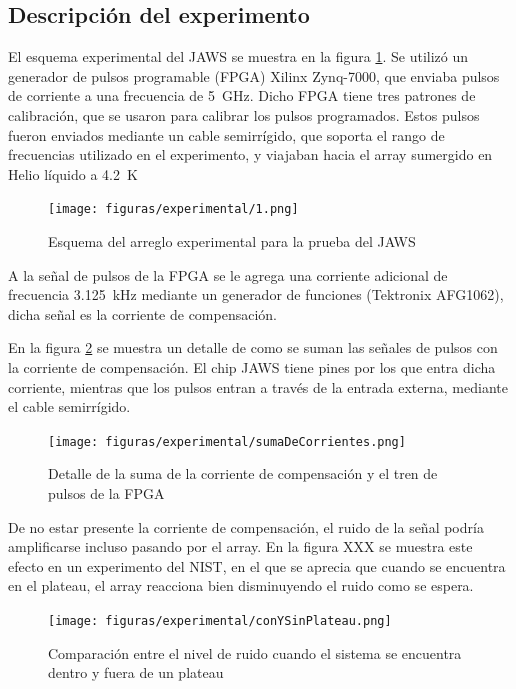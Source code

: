 \documentclass[twoside]{article}
\begin{document}
\begin{multicols}{2}
\section{Descripción del experimento}

El esquema experimental del JAWS se muestra en la figura \ref{fig:experimental_1}. Se utilizó un generador de pulsos programable (FPGA) Xilinx Zynq-7000, que enviaba pulsos de corriente a una frecuencia de \SI{5}{\giga\hertz}. Dicho FPGA tiene tres patrones de calibración, que se usaron para calibrar los pulsos programados. Estos pulsos fueron enviados mediante un cable semirrígido, que soporta el rango de frecuencias utilizado en el experimento, y viajaban hacia el array sumergido en Helio líquido a \SI{4.2}{\kelvin}

\begin{figure}[H]
    \centering
    \texttt{[image: figuras/experimental/1.png]}
    \caption{Esquema del arreglo experimental para la prueba del JAWS}
    \label{fig:experimental_1}
\end{figure}

A la señal de pulsos de la FPGA se le agrega una corriente adicional de frecuencia \SI{3.125}{\kilo\hertz} mediante un generador de funciones (Tektronix AFG1062), dicha señal es la corriente de compensación.

En la figura \ref{fig:experimental_sumaDeCorrientes} se muestra un detalle de como se suman las señales de pulsos con la corriente de compensación. El chip JAWS tiene pines por los que entra dicha corriente, mientras que los pulsos entran a través de la entrada externa, mediante el cable semirrígido.

\begin{figure}[H]
    \centering
    \texttt{[image: figuras/experimental/sumaDeCorrientes.png]}
    \caption{Detalle de la suma de la corriente de compensación y el tren de pulsos de la FPGA}
    \label{fig:experimental_sumaDeCorrientes}
\end{figure}

De no estar presente la corriente de compensación, el ruido de la señal podría amplificarse incluso pasando por el array. En la figura XXX se muestra este efecto en un experimento del NIST, en el que se aprecia que cuando se encuentra en el plateau, el array reacciona bien disminuyendo el ruido como se espera.

\begin{figure}[H]
    \centering
    \texttt{[image: figuras/experimental/conYSinPlateau.png]}
    \caption{Comparación entre el nivel de ruido cuando el sistema se encuentra dentro y fuera de un plateau}
    \label{fig:experimental_conYSinPlateau}
\end{figure}


\end{multicols}
\end{document}

